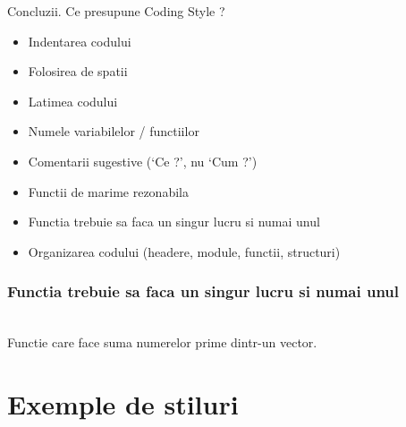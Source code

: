 \documentclass{beamer}
\begin{document}
  \begin{frame}{Concluzii. Ce presupune Coding Style ?}
  \begin{itemize}
  \setlength{\itemsep}{0.3cm}
  \item Indentarea codului
  \item Folosirea de spatii
  \item Latimea codului
  \item Numele variabilelor / functiilor
  \item Comentarii sugestive ({\ttfamily `Ce ?'}, nu {\ttfamily `Cum ?'})
  \item Functii de marime rezonabila
  \item Functia trebuie sa faca un singur lucru si numai unul
  \item Organizarea codului (headere, module, functii, structuri)
  \end{itemize}
  \end{frame}

  \begin{frame}[allowframebreaks]
  \frametitle{Functia trebuie sa faca un singur lucru si numai unul}
   \\
  \framebreak
  Functie care face suma numerelor prime dintr-un vector.
  \end{frame}

\section{Exemple de stiluri}

  \frame{\tableofcontents[currentsection]}
\end{document}
